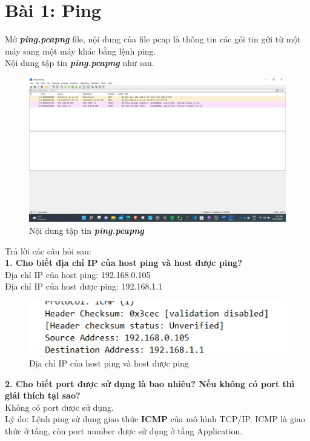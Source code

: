 \section{Bài 1: Ping}
Mở \textbf{\textit{ping.pcapng}} file, nội dung của file pcap là thông tin các gói tin gửi từ một máy sang một máy khác bằng lệnh ping.\\
Nội dung tập tin \textbf{\textit{ping.pcapng}} như sau.
\begin{figure}[H]
\begin{center}
\includegraphics[scale=0.45]{../figures/p1/p1_ping}
\end{center}
\caption{Nội dung tập tin \textbf{\textit{ping.pcapng}}}
\end{figure}
Trả lời các câu hỏi sau:\\
\textbf{1.	Cho biết địa chỉ IP của host ping và host được ping?}\\
Địa chỉ IP của host ping: 192.168.0.105\\
Địa chỉ IP của host được ping: 192.168.1.1
\begin{figure}[H]
\begin{center}
\includegraphics[scale=1]{../figures/p1/p1_r1}
\end{center}
\caption{Địa chỉ IP của host ping và host được ping}
\end{figure}

\textbf{2.	Cho biết port được sử dụng là bao nhiêu? Nếu không có port thì giải thích tại sao?}\\
Không có port được sử dụng.\\
Lý do: Lệnh ping sử dụng giao thức \textbf{ICMP} của mô hình TCP/IP. ICMP là giao thức ở tầng, còn port number được sử dụng ở tầng Application.


